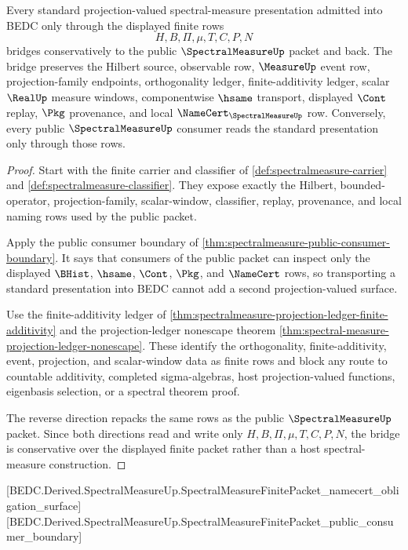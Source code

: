 \begin{theorem}
\label{thm:spectral-measure-finite-packet-standard-bridge}
Every standard projection-valued spectral-measure presentation admitted into BEDC only through the displayed finite rows
$$
H,B,\Pi,\mu,T,C,P,N
$$
bridges conservatively to the public $\SpectralMeasureUp$ packet and back. The bridge preserves the Hilbert source, observable row, $\MeasureUp$ event row, projection-family endpoints, orthogonality ledger, finite-additivity ledger, scalar $\RealUp$ measure windows, componentwise $\hsame$ transport, displayed $\Cont$ replay, $\Pkg$ provenance, and local $\NameCert_{\SpectralMeasureUp}$ row. Conversely, every public $\SpectralMeasureUp$ consumer reads the standard presentation only through those rows.
\end{theorem}
\begin{proof}
Start with the finite carrier and classifier of \autoref{def:spectralmeasure-carrier} and \autoref{def:spectralmeasure-classifier}. They expose exactly the Hilbert, bounded-operator, projection-family, scalar-window, classifier, replay, provenance, and local naming rows used by the public packet.

Apply the public consumer boundary of \autoref{thm:spectralmeasure-public-consumer-boundary}. It says that consumers of the public packet can inspect only the displayed $\BHist$, $\hsame$, $\Cont$, $\Pkg$, and $\NameCert$ rows, so transporting a standard presentation into BEDC cannot add a second projection-valued surface.

Use the finite-additivity ledger of \autoref{thm:spectralmeasure-projection-ledger-finite-additivity} and the projection-ledger nonescape theorem \autoref{thm:spectral-measure-projection-ledger-nonescape}. These identify the orthogonality, finite-additivity, event, projection, and scalar-window data as finite rows and block any route to countable additivity, completed sigma-algebras, host projection-valued functions, eigenbasis selection, or a spectral theorem proof.

The reverse direction repacks the same rows as the public $\SpectralMeasureUp$ packet. Since both directions read and write only $H,B,\Pi,\mu,T,C,P,N$, the bridge is conservative over the displayed finite packet rather than a host spectral-measure construction.
\end{proof}

[BEDC.Derived.SpectralMeasureUp.SpectralMeasureFinitePacket\_namecert\_obligation\_surface]
[BEDC.Derived.SpectralMeasureUp.SpectralMeasureFinitePacket\_public\_consumer\_boundary]

